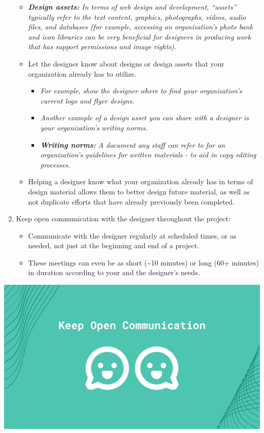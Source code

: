 \documentclass[
]{book}
\providecommand{\tightlist}{%
  \setlength{\itemsep}{0pt}\setlength{\parskip}{0pt}}
\begin{document}
\begin{enumerate}
  \begin{itemize}
  \tightlist
  \item
    \emph{\textbf{Design assets:} In terms of web design and development, ``assets'' typically refer to the text content, graphics, photographs, videos, audio files, and databases (for example, accessing an organization's photo bank and icon libraries can be very beneficial for designers in producing work that has support permissions and image rights).}
  \item
    Let the designer know about designs or design assets that your organization already has to utilize.

    \begin{itemize}
    \tightlist
    \item
      \emph{For example, show the designer where to find your organization's current logo and flyer designs.}
    \item
      \emph{Another example of a design asset you can share with a designer is your organization's writing norms.}
    \item
      \emph{\textbf{Writing norms:} A document any staff can refer to for an organization's guidelines for written materials - to aid in copy editing processes.}
    \end{itemize}
  \item
    Helping a designer know what your organization already has in terms of design material allows them to better design future material, as well as not duplicate efforts that have already previously been completed.
  \end{itemize}
\item
  Keep open communication with the designer throughout the project:

  \begin{itemize}
  \tightlist
  \item
    Communicate with the designer regularly at scheduled times, or as needed, not just at the beginning and end of a project.
  \item
    These meetings can even be as short (\textasciitilde10 minutes) or long (60+ minutes) in duration according to your and the designer's needs.
  \end{itemize}
\end{enumerate}

\includegraphics{images/Working-With-Graphic-Designers-Graphic-1.png}
\end{document}
